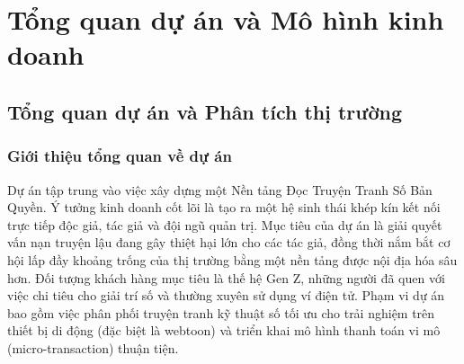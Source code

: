 \chapter{Tổng quan dự án và Mô hình kinh doanh}
\label{chap:phan1_phan2}

\section{Tổng quan dự án và Phân tích thị trường}

\subsection{Giới thiệu tổng quan về dự án}
Dự án tập trung vào việc xây dựng một Nền tảng Đọc Truyện Tranh Số Bản Quyền. Ý tưởng kinh doanh cốt lõi là tạo ra một hệ sinh thái khép kín kết nối trực tiếp độc giả, tác giả và đội ngũ quản trị. Mục tiêu của dự án là giải quyết vấn nạn truyện lậu đang gây thiệt hại lớn cho các tác giả, đồng thời nắm bắt cơ hội lấp đầy khoảng trống của thị trường bằng một nền tảng được nội địa hóa sâu hơn. Đối tượng khách hàng mục tiêu là thế hệ Gen Z, những người đã quen với việc chi tiêu cho giải trí số và thường xuyên sử dụng ví điện tử. Phạm vi dự án bao gồm việc phân phối truyện tranh kỹ thuật số tối ưu cho trải nghiệm trên thiết bị di động (đặc biệt là webtoon) và triển khai mô hình thanh toán vi mô (micro-transaction) thuận tiện.

